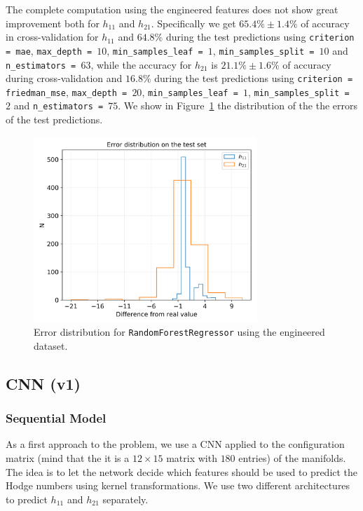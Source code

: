     The complete computation using the engineered features does not show great improvement both for $h_{11}$ and $h_{21}$. Specifically we get $65.4\% \pm 1.4\%$ of accuracy in cross-validation for $h_{11}$ and $64.8\%$ during the test predictions using \texttt{criterion = mae}, \texttt{max\_depth = $10$}, \texttt{min\_samples\_leaf = $1$}, \texttt{min\_samples\_split = $10$} and \texttt{n\_estimators = $63$}, while the accuracy for $h_{21}$ is $21.1\% \pm 1.6\%$ of accuracy during cross-validation and $16.8\%$ during the test predictions using \texttt{criterion = friedman\_mse}, \texttt{max\_depth = $20$}, \texttt{min\_samples\_leaf = $1$}, \texttt{min\_samples\_split = $2$} and \texttt{n\_estimators = $75$}. We show in Figure~\ref{fig:rnd_for_err} the distribution of the the errors of the test predictions.
    
    \begin{figure}[t]
        \centering
        \includegraphics[width=0.75\textwidth]{tex/img/rnd_for_error_eng.png}
        \caption{Error distribution for \texttt{RandomForestRegressor} using the engineered dataset.}
        \label{fig:rnd_for_err}
    \end{figure}
    
\subsection{CNN (v1)}

    \subsubsection{Sequential Model}
        As a first approach to the problem, we use a CNN applied to the configuration matrix (mind that the it is a $12 \times 15$ matrix with $180$ entries) of the manifolds. The idea is to let the network decide which features should be used to predict the Hodge numbers using kernel transformations. We use two different architectures to predict $h_{11}$ and $h_{21}$ separately.
        
